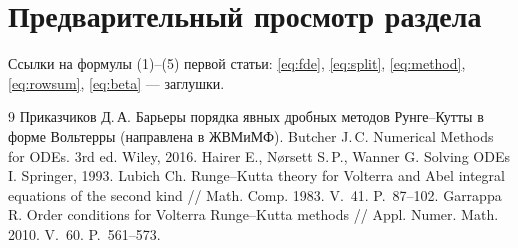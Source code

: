 \documentclass[11pt,a4paper]{article}
\theoremstyle{plain}\newtheorem{theorem}{Теорема}\newtheorem{lemma}{Лемма}\newtheorem{corollary}{Следствие}
\theoremstyle{definition}\newtheorem{definition}{Определение}\newtheorem{remark}{Замечание}
\begin{document}
\section*{Предварительный просмотр раздела}
Ссылки на формулы (1)--(5) первой статьи: \eqref{eq:fde}, \eqref{eq:split}, \eqref{eq:method}, \eqref{eq:rowsum}, \eqref{eq:beta} --- заглушки.
\begin{equation}\label{eq:fde}\end{equation}\begin{equation}\label{eq:split}\end{equation}\begin{equation}\label{eq:method}\end{equation}\begin{equation}\label{eq:rowsum}\end{equation}\begin{equation}\label{eq:beta}\end{equation}

\begin{thebibliography}{9}
 Приказчиков Д.\,А. Барьеры порядка явных дробных методов Рунге--Кутты в форме Вольтерры (направлена в ЖВМиМФ).
 Butcher J.\,C. Numerical Methods for ODEs. 3rd ed. Wiley, 2016.
 Hairer E., N{\o}rsett S.\,P., Wanner G. Solving ODEs I. Springer, 1993.
 Lubich Ch. Runge--Kutta theory for Volterra and Abel integral equations of the second kind // Math. Comp. 1983. V.~41. P.~87--102.
 Garrappa R. Order conditions for Volterra Runge--Kutta methods // Appl. Numer. Math. 2010. V.~60. P.~561--573.
\end{thebibliography}
\end{document}
